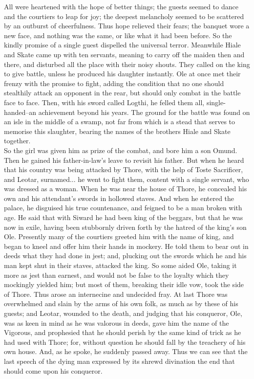 \documentclass[10pt,a4paper]{report}
\begin{document}
All were heartened with the hope of better things; the guests seemed to dance and the courtiers to leap for joy; the deepest melancholy seemed to be scattered by an outburst of cheerfulness. Thus hope relieved their fears; the banquet wore a new face, and nothing was the same, or like what it had been before. So the kindly promise of a single guest dispelled the universal terror. Meanwhile Hiale and Skate came up with ten servants, meaning to carry off the maiden then and there, and disturbed all the place with their noisy shouts. They called on the king to give battle, unless he produced his daughter instantly. Ole at once met their frenzy with the promise to fight, adding the condition that no one should stealthily attack an opponent in the rear, but should only combat in the battle face to face. Then, with his sword called Logthi, he felled them all, single-handed--an achievement beyond his years. The ground for the battle was found on an isle in the middle of a swamp, not far from which is a stead that serves to memorise this slaughter, bearing the names of the brothers Hiale and Skate together.\\

So the girl was given him as prize of the combat, and bore him a son Omund. Then he gained his father-in-law's leave to revisit his father. But when he heard that his country was being attacked by Thore, with the help of Toste Sacrificer, and Leotar, surnamed... he went to fight them, content with a single servant, who was dressed as a woman. When he was near the house of Thore, he concealed his own and his attendant's swords in hollowed staves. And when he entered the palace, he disguised his true countenance, and feigned to be a man broken with age. He said that with Siward he had been king of the beggars, but that he was now in exile, having been stubbornly driven forth by the hatred of the king's son Ole. Presently many of the courtiers greeted him with the name of king, and began to kneel and offer him their hands in mockery. He told them to bear out in deeds what they had done in jest; and, plucking out the swords which he and his man kept shut in their staves, attacked the king. So some aided Ole, taking it more as jest than earnest, and would not be false to the loyalty which they mockingly yielded him; but most of them, breaking their idle vow, took the side of Thore. Thus arose an internecine and undecided fray. At last Thore was overwhelmed and slain by the arms of his own folk, as much as by these of his guests; and Leotar, wounded to the death, and judging that his conqueror, Ole, was as keen in mind as he was valorous in deeds, gave him the name of the Vigorous, and prophesied that he should perish by the same kind of trick as he had used with Thore; for, without question he should fall by the treachery of his own house. And, as he spoke, he suddenly passed away. Thus we can see that the last speech of the dying man expressed by its shrewd divination the end that should come upon his conqueror.\\
\end{document}
